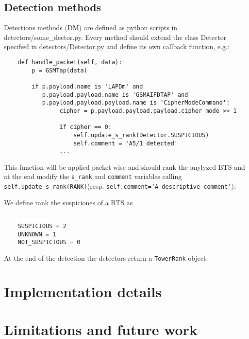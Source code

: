 \documentclass[preprint,12pt,3p]{elsarticle}
\begin{document}
\subsection{Detection methods}

Detections methods (DM) are defined as python scripts in detectors/some\_dector.py. Every method should extend the class Detector specified in detectors/Detector.py and define its own callback function, e.g.:
\lstset{language=Python}
\begin{lstlisting}
    def handle_packet(self, data):
        p = GSMTap(data)

        if p.payload.name is 'LAPDm' and
           p.payload.payload.name is 'GSMAIFDTAP' and
           p.payload.payload.payload.name is 'CipherModeCommand':
                cipher = p.payload.payload.payload.cipher_mode >> 1

                if cipher == 0:
                    self.update_s_rank(Detector.SUSPICIOUS)
                    self.comment = 'A5/1 detected'
                ...

\end{lstlisting}

This function will be applied packet wise and should rank the anylyzed BTS and at the end modify the \texttt{s\_rank} and \texttt{comment} variables calling \texttt{self.update\_s\_rank(RANK)}(resp. \texttt{self.comment='A descriptive comment'}).

We define rank the suspiciones of a BTS as
\begin{lstlisting}

    SUSPICIOUS = 2
    UNKNOWN = 1
    NOT_SUSPICIOUS = 0
\end{lstlisting}

At the end of the detection the detectors return a \texttt{TowerRank} object.




\section{Implementation details}
\section{Limitations and future work}






\end{document}
